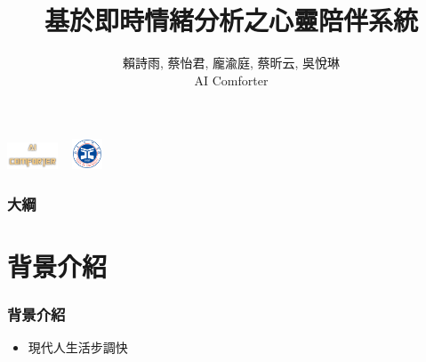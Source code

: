 \documentclass[10pt, conference, compsocconf]{beamer}
\begin{document}
\begin{CJK}{UTF8}{}%
\title{基於即時情緒分析之心靈陪伴系統}
\author{
賴詩雨, 蔡怡君, 龐渝庭, 蔡昕云, 吳悅琳 \\
\vspace{5mm}
AI Comforter\\
}





\begin{frame}
\titlepage
\raggedleft \includegraphics[width=1.5cm]{./Figures/AI_Comforter_5.png} ~
\raggedleft \includegraphics[width=0.9cm]{./Figures/yzu-logo.png}
\end{frame}



\begin{frame}
\frametitle{大綱}
  \tableofcontents
\end{frame}

\section{背景介紹}
\begin{frame}
\frametitle{背景介紹}

\begin{itemize}
\item \Large 現代人生活步調快
\end{itemize}



\end{frame}
\end{CJK}
\end{document}
